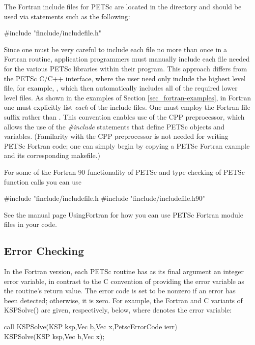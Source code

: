 The Fortran include files for PETSc are located in the directory 
 and should be used via statements 
such as the following:
\begin{tabbing}
    \#include "finclude/includefile.h"
\end{tabbing}
Since one must be very careful to include each file no more than once
in a Fortran routine, application programmers must manually include
each file needed for the various PETSc libraries within their
program.  This approach differs from the PETSc C/C++ interface, where
the user need only include the highest level file, for example, , which then automatically includes all of the required lower
level files.  As shown in the examples of Section
\ref{sec_fortran-examples}, in Fortran one must explicitly list {\em
each} of the include files. One must employ
the Fortran file suffix 
rather than .  This convention enables use of the CPP
preprocessor, which allows the use of the {\em \#include} statements
that define PETSc objects and variables. (Familarity with the CPP
preprocessor is not needed for writing PETSc Fortran code; one can simply
begin by copying a PETSc Fortran example and its corresponding
makefile.)  

For some of the Fortran 90 functionality of PETSc and type checking
of PETSc function calls you can use
\begin{tabbing}
    \#include "finclude/includefile.h
    \#include "finclude/includefile.h90"
\end{tabbing}
See the manual page UsingFortran for how you can use PETSc Fortran
module files in your code.

\subsection{Error Checking}
\label{sec_fortran_errors}

In the Fortran version, each PETSc routine has as its final argument
an integer error variable, in contrast to the C convention of
providing the error variable as the routine's return value.  The error
code is set to be nonzero if an error has been detected; otherwise, it
is zero.  For example, the Fortran and C variants of KSPSolve() are
given, respectively, below, where  denotes the error variable:
\begin{tabbing}
   call KSPSolve(KSP ksp,Vec b,Vec x,PetscErrorCode ierr)\\
  KSPSolve(KSP ksp,Vec b,Vec x);
\end{tabbing}


